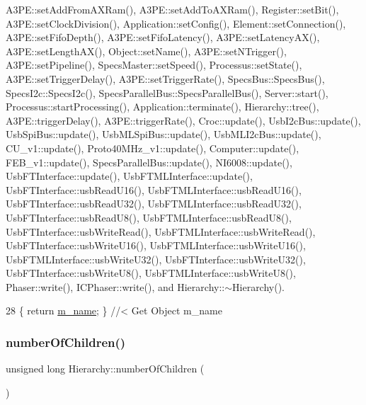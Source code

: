 A3\+P\+E\+::set\+Add\+From\+A\+X\+Ram(), A3\+P\+E\+::set\+Add\+To\+A\+X\+Ram(), Register\+::set\+Bit(), A3\+P\+E\+::set\+Clock\+Division(), Application\+::set\+Config(), Element\+::set\+Connection(), A3\+P\+E\+::set\+Fifo\+Depth(), A3\+P\+E\+::set\+Fifo\+Latency(), A3\+P\+E\+::set\+Latency\+A\+X(), A3\+P\+E\+::set\+Length\+A\+X(), Object\+::set\+Name(), A3\+P\+E\+::set\+N\+Trigger(), A3\+P\+E\+::set\+Pipeline(), Specs\+Master\+::set\+Speed(), Processus\+::set\+State(), A3\+P\+E\+::set\+Trigger\+Delay(), A3\+P\+E\+::set\+Trigger\+Rate(), Specs\+Bus\+::\+Specs\+Bus(), Specs\+I2c\+::\+Specs\+I2c(), Specs\+Parallel\+Bus\+::\+Specs\+Parallel\+Bus(), Server\+::start(), Processus\+::start\+Processing(), Application\+::terminate(), Hierarchy\+::tree(), A3\+P\+E\+::trigger\+Delay(), A3\+P\+E\+::trigger\+Rate(), Croc\+::update(), Usb\+I2c\+Bus\+::update(), Usb\+Spi\+Bus\+::update(), Usb\+M\+L\+Spi\+Bus\+::update(), Usb\+M\+L\+I2c\+Bus\+::update(), C\+U\+\_\+v1\+::update(), Proto40\+M\+Hz\+\_\+v1\+::update(), Computer\+::update(), F\+E\+B\+\_\+v1\+::update(), Specs\+Parallel\+Bus\+::update(), N\+I6008\+::update(), Usb\+F\+T\+Interface\+::update(), Usb\+F\+T\+M\+L\+Interface\+::update(), Usb\+F\+T\+Interface\+::usb\+Read\+U16(), Usb\+F\+T\+M\+L\+Interface\+::usb\+Read\+U16(), Usb\+F\+T\+Interface\+::usb\+Read\+U32(), Usb\+F\+T\+M\+L\+Interface\+::usb\+Read\+U32(), Usb\+F\+T\+Interface\+::usb\+Read\+U8(), Usb\+F\+T\+M\+L\+Interface\+::usb\+Read\+U8(), Usb\+F\+T\+Interface\+::usb\+Write\+Read(), Usb\+F\+T\+M\+L\+Interface\+::usb\+Write\+Read(), Usb\+F\+T\+Interface\+::usb\+Write\+U16(), Usb\+F\+T\+M\+L\+Interface\+::usb\+Write\+U16(), Usb\+F\+T\+M\+L\+Interface\+::usb\+Write\+U32(), Usb\+F\+T\+Interface\+::usb\+Write\+U32(), Usb\+F\+T\+Interface\+::usb\+Write\+U8(), Usb\+F\+T\+M\+L\+Interface\+::usb\+Write\+U8(), Phaser\+::write(), I\+C\+Phaser\+::write(), and Hierarchy\+::$\sim$\+Hierarchy().


\begin{DoxyCode}
28 \{ \textcolor{keywordflow}{return} \hyperlink{classObject_a8b83c95c705d2c3ba0d081fe1710f48d}{m\_name}; \} \textcolor{comment}{//< Get Object m\_name}
\end{DoxyCode}
\mbox{\label{classHierarchy_ab16e84de65fd84e14001a6cf941c8be4}} 
\subsubsection{\texorpdfstring{number\+Of\+Children()}{numberOfChildren()}}
{\footnotesize\ttfamily unsigned long Hierarchy\+::number\+Of\+Children (\begin{DoxyParamCaption}{ }\end{DoxyParamCaption})\hspace{0.3cm}{\ttfamily [inherited]}}




